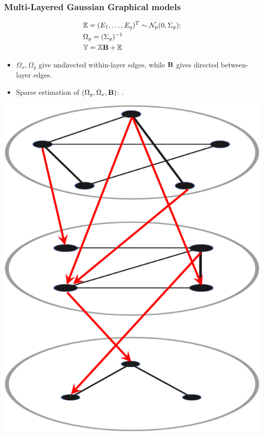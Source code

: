 \documentclass[10pt]{beamer}
\theoremstyle{definition}
\begin{document}
\begin{frame}
\frametitle{Multi-Layered Gaussian Graphical models}

\begin{minipage}{.45\textwidth}
%
\begin{align*}
& {\mathbb{E}} = (E_1, \ldots, E_q)^T \sim {\cal{N}}_p (0, \Sigma_y);\\
& \Omega_y = (\Sigma_y)^{-1}\\
& {\mathbb{Y}} = {\mathbb{X}} {\mathbf{B}} + {\mathbb{E}}\\
\end{align*}
%

\begin{itemize}
\item $\Omega_x, \Omega_y$ give undirected within-layer edges, while ${\mathbf{B}}$ gives directed between-layer edges.
\vspace{1em}

\item Sparse estimation of $(\Omega_y, \Omega_x, {\mathbf{B}})$: {\colr\cite{LinEtal16}}.
\end{itemize}
\end{minipage}
%
\begin{minipage}{.45\textwidth}
\centering
\includegraphics[height=.7\textheight]{formulation_5}
\end{minipage}

\end{frame}
\end{document}
